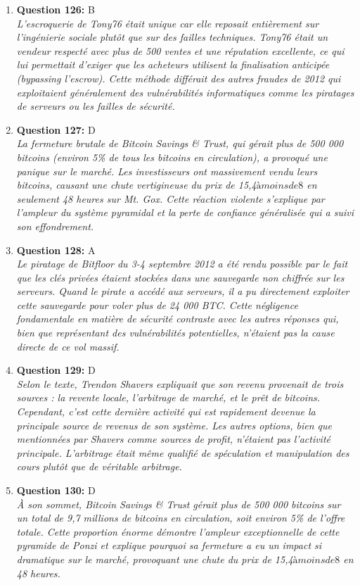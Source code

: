 \documentclass[12pt,a4paper]{article}
\begin{document}
\begin{enumerate}
\item \textbf{Question 126:} B
\\ \textit{L'escroquerie de Tony76 était unique car elle reposait entièrement sur l'ingénierie sociale plutôt que sur des failles techniques. Tony76 était un vendeur respecté avec plus de 500 ventes et une réputation excellente, ce qui lui permettait d'exiger que les acheteurs utilisent la finalisation anticipée (bypassing l'escrow). Cette méthode différait des autres fraudes de 2012 qui exploitaient généralement des vulnérabilités informatiques comme les piratages de serveurs ou les failles de sécurité.}

\item \textbf{Question 127:} D
\\ \textit{La fermeture brutale de Bitcoin Savings & Trust, qui gérait plus de 500 000 bitcoins (environ 5\% de tous les bitcoins en circulation), a provoqué une panique sur le marché. Les investisseurs ont massivement vendu leurs bitcoins, causant une chute vertigineuse du prix de 15,4$ à moins de 8$ en seulement 48 heures sur Mt. Gox. Cette réaction violente s'explique par l'ampleur du système pyramidal et la perte de confiance généralisée qui a suivi son effondrement.}

\item \textbf{Question 128:} A
\\ \textit{Le piratage de Bitfloor du 3-4 septembre 2012 a été rendu possible par le fait que les clés privées étaient stockées dans une sauvegarde non chiffrée sur les serveurs. Quand le pirate a accédé aux serveurs, il a pu directement exploiter cette sauvegarde pour voler plus de 24 000 BTC. Cette négligence fondamentale en matière de sécurité contraste avec les autres réponses qui, bien que représentant des vulnérabilités potentielles, n'étaient pas la cause directe de ce vol massif.}

\item \textbf{Question 129:} D
\\ \textit{Selon le texte, Trendon Shavers expliquait que son revenu provenait de trois sources : la revente locale, l'arbitrage de marché, et le prêt de bitcoins. Cependant, c'est cette dernière activité qui est rapidement devenue la principale source de revenus de son système. Les autres options, bien que mentionnées par Shavers comme sources de profit, n'étaient pas l'activité principale. L'arbitrage était même qualifié de spéculation et manipulation des cours plutôt que de véritable arbitrage.}

\item \textbf{Question 130:} D
\\ \textit{À son sommet, Bitcoin Savings & Trust gérait plus de 500 000 bitcoins sur un total de 9,7 millions de bitcoins en circulation, soit environ 5\% de l'offre totale. Cette proportion énorme démontre l'ampleur exceptionnelle de cette pyramide de Ponzi et explique pourquoi sa fermeture a eu un impact si dramatique sur le marché, provoquant une chute du prix de 15,4$ à moins de 8$ en 48 heures.}


\end{enumerate}
\end{document}
